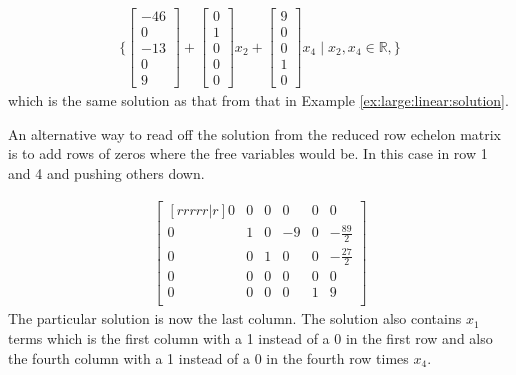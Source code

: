 \begin{example}
\begin{align*}
\{ \begin{bmatrix}
-46 \\
0 \\
-13 \\
0 \\
9
\end{bmatrix} +
\begin{bmatrix}
0 \\ 1 \\ 0 \\ 0 \\ 0
\end{bmatrix} x_2 + \begin{bmatrix}
9 \\ 0 \\ 0 \\ 1 \\ 0
\end{bmatrix} x_4 \; | \; x_2, x_4 \in \mathbb{R}, \}
\end{align*}
which is the same solution as that from that in Example \ref{ex:large:linear:solution}.

An alternative way to read off the solution from the reduced row echelon matrix is to add rows of zeros where the free variables would be.  In this case in row 1 and 4 and pushing others down.

\begin{align*}
\begin{bmatrix}[rrrrr|r]
0 & 0 & 0 & 0 & 0 & 0 \\
0 & 1 & 0 & -9 & 0 & -\frac{89}{2} \\
0 & 0 & 1 & 0 & 0 & -\frac{27}{2} \\
0 & 0 & 0 & 0 & 0 & 0 \\
0 & 0 & 0 & 0 & 1 & 9 \\
\end{bmatrix}
\end{align*}
The particular solution is now the last column.  The solution also contains $x_1$ terms which is the first column with a 1 instead of a 0 in the first row and also the fourth column with a 1 instead of a 0 in the fourth row times $x_4$.

\end{example}

~

\phantom{Empty sTff}


